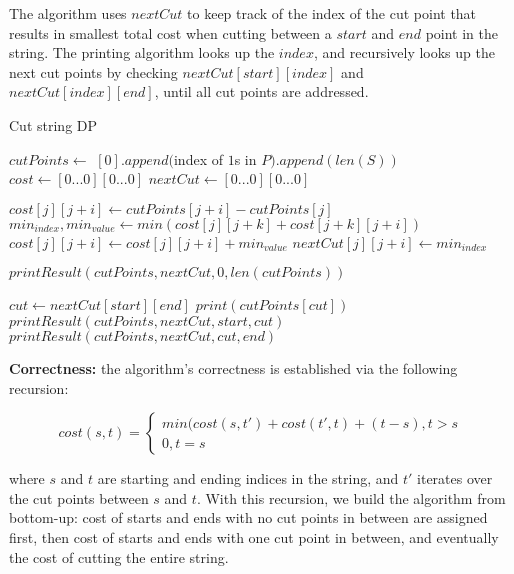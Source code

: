 \documentclass{article}
\begin{document}
\begin{description}
  The algorithm uses $nextCut$ to keep track of the index of the cut point that results in smallest total cost when cutting between a $start$ and $end$ point in the string. The printing algorithm looks up the $index$, and recursively looks up the next cut points by checking $nextCut[start][index]$ and $nextCut[index][end]$, until all cut points are addressed.

  \begin{algorithm}[H]
  \caption{Cut string DP}
  \label{alg:cut-string-dp}
    \begin{algorithmic}[1]

      \State $cutPoints \gets $ $[0].append($index of $1$s in $P).append(len(S))$ 
      \State $cost \gets [0...0][0...0]$
      \State $nextCut \gets [0...0][0...0]$

          \State $cost[j][j+i] \gets cutPoints[j+i] - cutPoints[j]$
            \State $min_{index}, min_{value} \gets min(cost[j][j+k] + cost[j+k][j+i])$
          \EndFor
          \State $cost[j][j+i] \gets cost[j][j+i] + min_{value}$
          \State $nextCut[j][j+i] \gets min_{index}$
        \EndFor
      \EndFor

      \State $printResult(cutPoints, nextCut, 0, len(cutPoints))$
      \State {}
    \EndFunction

      \State $cut \gets nextCut[start][end]$
        \State $print(cutPoints[cut])$
      \EndIf
        \State \Return {}
      \EndIf
      \State $printResult(cutPoints, nextCut, start, cut)$
      \State $printResult(cutPoints, nextCut, cut, end)$
    \EndFunction

    \end{algorithmic}
  \end{algorithm}

  \textbf{Correctness:} the algorithm's correctness is established via the following recursion:

\[
  cost(s,t) = \begin{cases}
                min(cost(s, t') + cost(t',t) + (t - s), t > s \\
                0, t = s
              \end{cases}
\]

  where $s$ and $t$ are starting and ending indices in the string, and $t'$ iterates over the cut points between $s$ and $t$. With this recursion, we build the algorithm from bottom-up: cost of starts and ends with no cut points in between are assigned first, then cost of starts and ends with one cut point in between, and eventually the cost of cutting the entire string.


\end{description}
\end{document}
